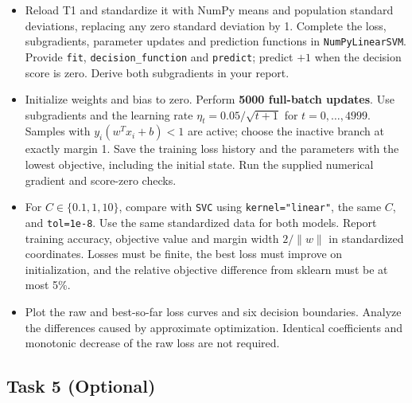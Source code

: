 \documentclass[12pt,a4paper]{article}
\begin{document}
\begin{itemize}
  \item Reload T1 and standardize it with NumPy means and population standard
        deviations, replacing any zero standard deviation by 1. Complete the
        loss, subgradients, parameter updates and prediction functions in
        \texttt{NumPyLinearSVM}. Provide \texttt{fit},
        \texttt{decision\_function} and \texttt{predict}; predict $+1$ when the
        decision score is zero. Derive both subgradients in your report.

  \item Initialize weights and bias to zero. Perform \textbf{5000 full-batch
        updates}. Use subgradients and the learning rate
        $\eta_t=0.05/\sqrt{t+1}$ for
        $t=0,\ldots,4999$. Samples with $y_i(w^T x_i+b)<1$ are active;
        choose the inactive branch at exactly margin 1. Save the training loss
        history and the parameters with the lowest objective, including the
        initial state. Run the supplied numerical gradient and score-zero checks.

  \item For $C\in\{0.1,1,10\}$, compare with \texttt{SVC} using
        \texttt{kernel="linear"}, the same $C$, and \texttt{tol=1e-8}.
        Use the same standardized data for both models. Report training accuracy,
        objective value and margin width
        $2/\lVert w\rVert$ in standardized coordinates. Losses must be finite,
        the best loss must improve on initialization, and the relative objective
        difference from sklearn must be at most 5\%.

  \item Plot the raw and best-so-far loss curves and six decision boundaries.
        Analyze the differences caused by approximate optimization. Identical
        coefficients and monotonic decrease of the raw loss are not required.
\end{itemize}

\subsection{Task 5 (Optional)}
\end{document}
